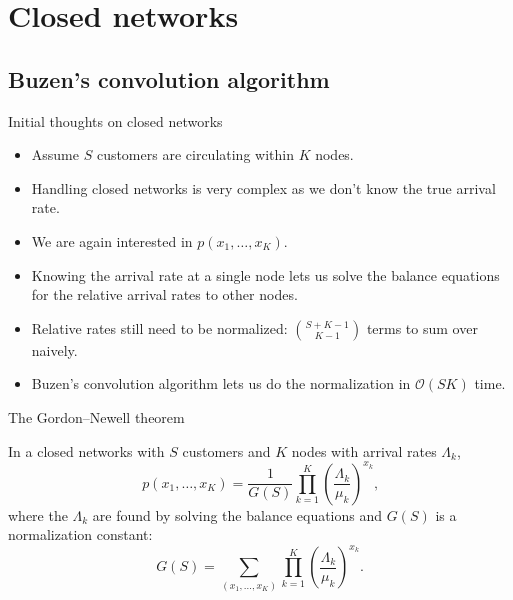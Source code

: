 \documentclass[serif, xcolor={svgnames, table}, usepdftitle=false]{beamer}
\begin{document}
\section{Closed networks}
\subsection{Buzen's convolution algorithm}
\begin{frame}{Initial thoughts on closed networks}
  \begin{itemize}
  \item Assume $S$ customers are circulating within $K$ nodes.
  \item Handling closed networks is very complex as we don't know the true
    arrival rate.
  \item We are again interested in $p(x_1, \ldots, x_K)$.
  \item Knowing the arrival rate at a single node lets us solve the balance
    equations for the relative arrival rates to other nodes.
  \item Relative rates still need to be normalized:
    $\displaystyle \binom{S + K - 1}{K - 1}$ terms to sum over naively.
  \item Buzen's convolution algorithm lets us do the normalization in
    $\mathcal{O}(S K)$ time.
  \end{itemize}
\end{frame}

{%
  \begin{frame}{The Gordon--Newell theorem}
    \begin{theorem}
      In a closed networks with $S$ customers and $K$ nodes with arrival rates
      $\Lambda_k$,
      \begin{equation*}
        p(x_1, \ldots, x_K) = \frac{1}{G(S)} \prod\limits_{k = 1}^{K}
        \left(\frac{\Lambda_k}{\mu_k}\right)^{x_k}\text{,}
      \end{equation*}
      where the $\Lambda_k$ are found by solving the balance equations and $G(S)$
      is a normalization constant:
      \begin{equation*}
        G(S) = \sum\limits_{(x_1,\ldots,x_K)} \prod\limits_{k = 1}^{K} \left(\frac{\Lambda_k}{\mu_k}\right)^{x_k}\text{.}
      \end{equation*}
    \end{theorem}
  \end{frame}}
\end{document}

